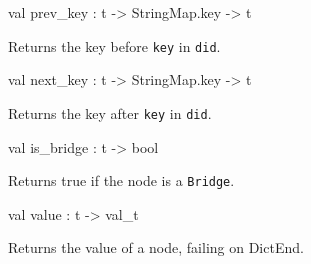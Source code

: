 \documentclass[11pt]{article}
\begin{document}
\label{val:Key.prev-underscorekey}\begin{ocamldoccode}
val prev_key : t -> StringMap.key -> t
\end{ocamldoccode}
\begin{ocamldocdescription}
Returns the key before {\tt{key}} in {\tt{did}}.


\end{ocamldocdescription}




\label{val:Key.next-underscorekey}\begin{ocamldoccode}
val next_key : t -> StringMap.key -> t
\end{ocamldoccode}
\begin{ocamldocdescription}
Returns the key after {\tt{key}} in {\tt{did}}.


\end{ocamldocdescription}




\label{val:Key.is-underscorebridge}\begin{ocamldoccode}
val is_bridge : t -> bool
\end{ocamldoccode}
\begin{ocamldocdescription}
Returns true if the node is a {\tt{Bridge}}.


\end{ocamldocdescription}




\label{val:Key.value}\begin{ocamldoccode}
val value : t -> val_t
\end{ocamldoccode}
\begin{ocamldocdescription}
Returns the value of a node, failing on DictEnd.


\end{ocamldocdescription}
\end{document}
